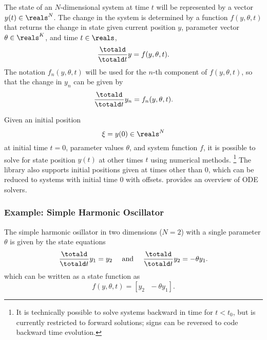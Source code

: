 \documentclass[10pt]{article}
\begin{document}
The state of an $N$-dimensional system at time $t$ will be represented
by a vector $y(t) \in \reals^N$. The change in the system is
determined by a function $f(y,\theta,t)$ that returns the change in
state given current position $y$, parameter vector $\theta \in
\reals^K$, and time $t \in \reals$,
\[
\frac{\totald}{\totald t} y = f(y,\theta,t).
\]
The notation $f_n(y,\theta,t)$ will be used for the $n$-th component
of $f(y,\theta,t)$, so that the change in $y_n$ can be given by
\[
\frac{\totald}{\totald t} y_n = f_n(y,\theta,t).
\]

Given an initial position 
\[
\xi = y(0) \in \reals^N
\]
at initial time $t = 0$, parameter values $\theta$, and system
function $f$, it is possible to solve for state position $y(t)$ at
other times $t$ using numerical methods.%
%
\footnote{It is technically possible to solve systems backward in time
  for $t < t_0$, but  is currently restricted to
  forward solutions; signs can be reversed to code backward time
  evolution.}
%
The  library also supports initial positions given
at times other than 0, which can be reduced to systems with initial
time 0 with offsets.  \cite[Chapter~17]{PressEtAl:2007} provides an
overview of ODE solvers. 


\subsubsection{Example: Simple Harmonic Oscillator}

The simple harmonic osillator in two dimensions ($N = 2$) with a
single parameter $\theta$ is given by the state equations
\[
\frac{\totald}{\totald t} y_1 = y_2
\ \ \ \ \mbox{and} \ \ \ \
\frac{\totald}{\totald t} y_2 = -\theta y_1.
\]
%
which can be written as a state function as
\[
f(y,\theta,t) = [y_2 \ \ \ -\theta y_1].
\]



\end{document}
